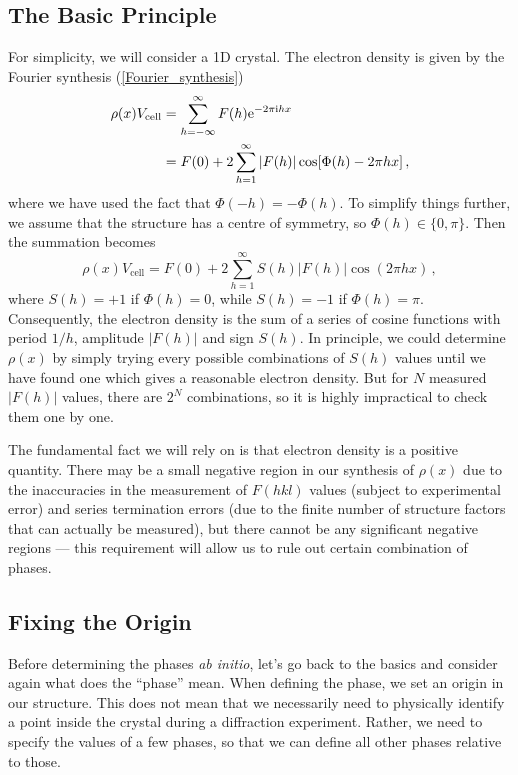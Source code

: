 \documentclass{article}
\theoremstyle{plain}\theoremheaderfont{\normalfont\itshape}\theorembodyfont{\rmfamily}\theoremseparator{.}\newtheorem*{rem}{Remark}\newtheorem*{ex}{Example}\newtheorem*{proof}{Proof}\newtheorem*{altp}{Alternative proof}
\theoremstyle{plain}\theoremheaderfont{\normalfont\bfseries}\theorembodyfont{\rmfamily}\theoremseparator{.}\newtheorem{thm}{Theorem}[section]\newtheorem{lem}[thm]{Lemma}\newtheorem{prop}[thm]{Proposition}\newtheorem*{cor}{Corollary}\newtheorem{defn}[thm]{Definition}\newtheorem{clm}[thm]{Claim}\newtheorem{clminproof}{Claim}\newtheorem*{law}{Law}\newtheorem{pos}[thm]{Postulate}
\theoremstyle{break}\theoremheaderfont{\normalfont\itshape}\theorembodyfont{\rmfamily}\theoremseparator{.\medskip}\newtheorem*{proofskip}{Proof}\newtheorem*{exs}{Examples}\newtheorem*{rems}{Remarks}
\theoremstyle{break}\theoremheaderfont{\normalfont\bfseries}\theorembodyfont{\rmfamily}\theoremseparator{.\medskip}\newtheorem{lemskip}[thm]{Lemma}\newtheorem{defnskip}[thm]{Definition}\newtheorem{propskip}[thm]{Proposition}\newtheorem{thmskip}[thm]{Theorem}
\numberwithin{equation}{section}
\newcommand{\ii}{\mathrm{i}}
\newcommand{\ee}{\mathrm{e}}
\newcommand{\abs}[1]{\left| #1 \right|}
\begin{document}
    \subsection{The Basic Principle}
    For simplicity, we will consider a 1D crystal. The electron density is given by the Fourier synthesis (\ref{Fourier_synthesis})
    \begin{align}
        \rho(x)V_{\text{cell}}&=\sum_{h=-\infty}^{\infty}F(h)\ee^{-2\pi \ii hx}\notag \\
        &=F(0)+2\sum_{h=1}^{\infty}\abs{F(h)}\cos[\Phi(h)-2\pi hx]\,,
    \end{align}
    where we have used the fact that \(\Phi(-h)=-\Phi(h)\). To simplify things further, we assume that the structure has a centre of symmetry, so \(\Phi(h)\in\{0,\pi\}\). Then the summation becomes
    \begin{equation}
        \rho(x)V_{\text{cell}}=F(0)+2\sum_{h=1}^{\infty}S(h)\abs{F(h)}\cos(2\pi hx)\,,
    \end{equation}
    where \(S(h)=+1\) if \(\Phi(h)=0\), while \(S(h)=-1\) if \(\Phi(h)=\pi\). Consequently, the electron density is the sum of a series of cosine functions with period \(1/h\), amplitude \(\abs{F(h)}\) and sign \(S(h)\). In principle, we could determine \(\rho(x)\) by simply trying every possible combinations of \(S(h)\) values until we have found one which gives a reasonable electron density. But for \(N\) measured \(\abs{F(h)}\) values, there are \(2^N\) combinations, so it is highly impractical to check them one by one.

    The fundamental fact we will rely on is that electron density is a positive quantity. There may be a small negative region in our synthesis of \(\rho(x)\) due to the inaccuracies in the measurement of \(F(hkl)\) values (subject to experimental error) and series termination errors (due to the finite number of structure factors that can actually be measured), but there cannot be any significant negative regions --- this requirement will allow us to rule out certain combination of phases.

    \subsection{Fixing the Origin}
    Before determining the phases \textit{ab initio}, let's go back to the basics and consider again what does the ``phase'' mean. When defining the phase, we set an origin in our structure. This does not mean that we necessarily need to physically identify a point inside the crystal during a diffraction experiment. Rather, we need to specify the values of a few phases, so that we can define all other phases relative to those.
\end{document}
